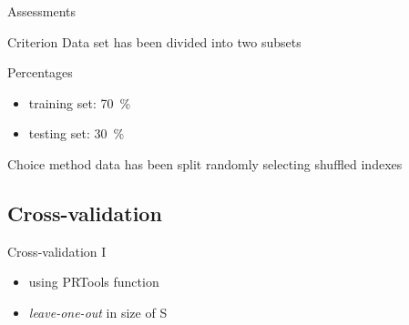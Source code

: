 \documentclass{beamer}
\begin{document}
\begin{frame}{Assessments}
\begin{block}{Criterion}
Data set has been divided into two subsets
\end{block}
\begin{block}{Percentages}
\begin{itemize}
	\item{
	training set: \SI{70}{\percent}
	}
	\item{
	testing set: \SI{30}{\percent}
	}
\end{itemize}
\end{block}
\begin{block}{Choice method}
data has been split randomly selecting shuffled indexes
\end{block}
\end{frame}



\subsection{Cross-validation}

\begin{frame}{Cross-validation I}
	\begin{itemize}
		\item{
		using PRTools function
		}
		\item{
		\emph{leave-one-out} in size of S
		}
	\end{itemize}
\end{frame}
\end{document}
